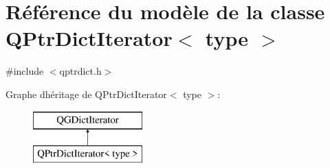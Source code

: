 \hypertarget{class_q_ptr_dict_iterator}{}\section{Référence du modèle de la classe Q\+Ptr\+Dict\+Iterator$<$ type $>$}
\label{class_q_ptr_dict_iterator}


{\ttfamily \#include $<$qptrdict.\+h$>$}

Graphe d\textquotesingle{}héritage de Q\+Ptr\+Dict\+Iterator$<$ type $>$\+:\begin{figure}[H]
\begin{center}
\leavevmode
\includegraphics[height=2.000000cm]{class_q_ptr_dict_iterator}
\end{center}
\end{figure}
